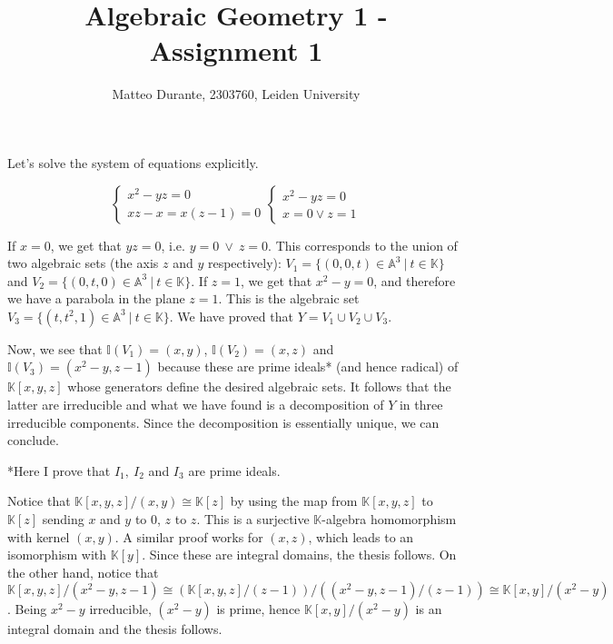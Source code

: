 \documentclass{article}
\newcommand{\numberset}{\mathbb}
\newcommand{\K}{\numberset{K}}
\newcommand{\I}{\mathbb{I}}
\newcommand{\A}{\mathbb{A}}
\newcommand{\exercise}[1]{\noindent {\bf Exercise #1}}
\begin{document}
\title{Algebraic Geometry 1 - Assignment 1}

\author{Matteo Durante, 2303760, Leiden University}

\maketitle


\exercise{1.8.11}

Let's solve the system of equations explicitly.

$$
\begin{cases}
		x^2-yz = 0 \\
		xz-x=x(z-1) = 0
\end{cases}
\begin{cases}
		x^2-yz=0 \\
		x=0 \lor z=1
\end{cases}
$$

If $x=0$, we get that $yz=0$, i.e. $y=0\ \lor\ z=0$. This corresponds to the union of two algebraic sets (the axis $z$ and $y$ respectively): $V_1=\{(0,0,t)\in\A^3\ |\ t\in\K\}$ and $V_2=\{(0,t,0)\in\A^3\ |\ t\in\K\}$. If $z=1$, we get that $x^2-y=0$, and therefore we have a parabola in the plane $z=1$. This is the algebraic set $V_3=\{(t,t^2,1)\in\A^3\ |\ t\in\K\}$. We have proved that $Y=V_1\cup V_2\cup V_3$.

Now, we see that $\I(V_1)=(x,y)$, $\I(V_2)=(x,z)$ and $\I(V_3)=(x^2-y,z-1)$ because these are prime ideals* (and hence radical) of $\K[x,y,z]$ whose generators define the desired algebraic sets. It follows that the latter are irreducible and what we have found is a decomposition of $Y$ in three irreducible components. Since the decomposition is essentially unique, we can conclude.

*Here I prove that $I_1,\ I_2$ and $I_3$ are prime ideals.

Notice that $\K[x,y,z]/(x,y)\cong\K[z]$ by using the map from $\K[x,y,z]$ to $\K[z]$ sending $x$ and $y$ to 0, $z$ to $z$. This is a surjective $\K$-algebra homomorphism with kernel $(x,y)$. A similar proof works for $(x,z)$, which leads to an isomorphism with $\K[y]$. Since these are integral domains, the thesis follows.
On the other hand, notice that $\K[x,y,z]/(x^2-y,z-1)\cong(\K[x,y,z]/(z-1))/((x^2-y,z-1)/(z-1))\cong\K[x,y]/(x^2-y)$. Being $x^2-y$ irreducible, $(x^2-y)$ is prime, hence $\K[x,y]/(x^2-y)$ is an integral domain and the thesis follows.

~\\
\end{document}
